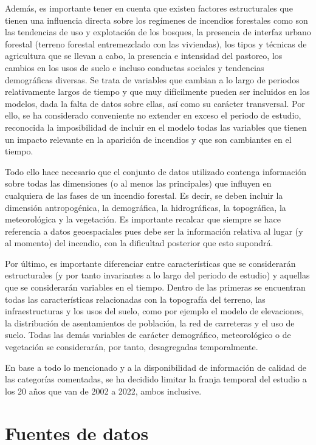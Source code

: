 \documentclass[12pt,a4paper,]{book}
\numberwithin{dummy}{section}
\theoremstyle{ocrenumbox}
\theoremstyle{blacknumex}
\theoremstyle{blacknumbox}
\theoremstyle{ocrenum}
\theoremstyle{ocrenum}
\begin{document}
Además, es importante tener en cuenta que existen factores estructurales
que tienen una influencia directa sobre los regímenes de incendios
forestales como son las tendencias de uso y explotación de los bosques,
la presencia de interfaz urbano forestal (terreno forestal entremezclado
con las viviendas), los tipos y técnicas de agricultura que se llevan a
cabo, la presencia e intensidad del pastoreo, los cambios en los usos de
suelo e incluso conductas sociales y tendencias demográficas diversas.
Se trata de variables que cambian a lo largo de periodos relativamente
largos de tiempo y que muy difícilmente pueden ser incluidos en los
modelos, dada la falta de datos sobre ellas, así como su carácter
transversal. Por ello, se ha considerado conveniente no extender en
exceso el periodo de estudio, reconocida la imposibilidad de incluir en
el modelo todas las variables que tienen un impacto relevante en la
aparición de incendios y que son cambiantes en el tiempo.

Todo ello hace necesario que el conjunto de datos utilizado contenga
información sobre todas las dimensiones (o al menos las principales) que
influyen en cualquiera de las fases de un incendio forestal. Es decir,
se deben incluir la dimensión antropogénica, la demográfica, la
hidrográficas, la topográfica, la meteorológica y la vegetación. Es
importante recalcar que siempre se hace referencia a datos geoespaciales
pues debe ser la información relativa al lugar (y al momento) del
incendio, con la dificultad posterior que esto supondrá.

Por último, es importante diferenciar entre características que se
considerarán estructurales (y por tanto invariantes a lo largo del
periodo de estudio) y aquellas que se considerarán variables en el
tiempo. Dentro de las primeras se encuentran todas las características
relacionadas con la topografía del terreno, las infraestructuras y los
usos del suelo, como por ejemplo el modelo de elevaciones, la
distribución de asentamientos de población, la red de carreteras y el
uso de suelo. Todas las demás variables de carácter demográfico,
meteorológico o de vegetación se considerarán, por tanto, desagregadas
temporalmente.

En base a todo lo mencionado y a la disponibilidad de información de
calidad de las categorías comentadas, se ha decidido limitar la franja
temporal del estudio a los 20 años que van de 2002 a 2022, ambos
inclusive.

\hypertarget{fuentes-de-datos}{%
\section{Fuentes de datos}\label{fuentes-de-datos}}
\end{document}
